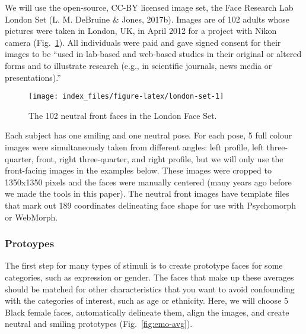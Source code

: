 \documentclass[
  doc,floatsintext]{apa6}
\begin{document}
We will use the open-source, CC-BY licensed image set, the Face Research Lab London Set (L. M. DeBruine \& Jones, 2017b). Images are of 102 adults whose pictures were taken in London, UK, in April 2012 for a project with Nikon camera (Fig.~\ref{fig:london-set}). All individuals were paid and gave signed consent for their images to be ``used in lab-based and web-based studies in their original or altered forms and to illustrate research (e.g., in scientific journals, news media or presentations).''

\begin{figure}
\texttt{[image: index\_files/figure-latex/london-set-1]} \caption{The 102 neutral front faces in the London Face Set.}\label{fig:london-set}
\end{figure}

Each subject has one smiling and one neutral pose. For each pose, 5 full colour images were simultaneously taken from different angles: left profile, left three-quarter, front, right three-quarter, and right profile, but we will only use the front-facing images in the examples below. These images were cropped to 1350x1350 pixels and the faces were manually centered (many years ago before we made the tools in this paper). The neutral front images have template files that mark out 189 coordinates delineating face shape for use with Psychomorph or WebMorph.

\hypertarget{protoypes}{%
\subsubsection{Protoypes}\label{protoypes}}

The first step for many types of stimuli is to create prototype faces for some categories, such as expression or gender. The faces that make up these averages should be matched for other characteristics that you want to avoid confounding with the categories of interest, such as age or ethnicity. Here, we will choose 5 Black female faces, automatically delineate them, align the images, and create neutral and smiling prototypes (Fig.~\ref{fig:emo-avg}).
\end{document}
